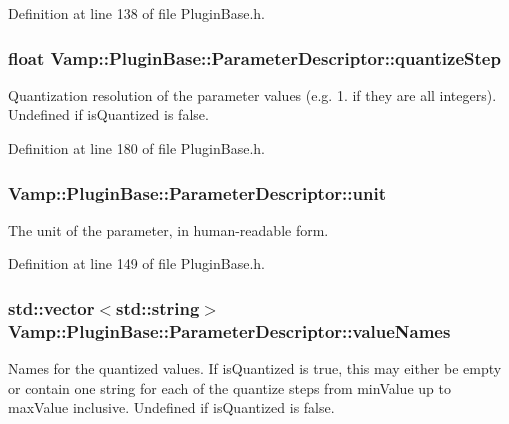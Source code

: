 Definition at line 138 of file Plugin\+Base.\+h.

\subsubsection[{\texorpdfstring{quantize\+Step}{quantizeStep}}]{\setlength{\rightskip}{0pt plus 5cm}float Vamp\+::\+Plugin\+Base\+::\+Parameter\+Descriptor\+::quantize\+Step}\hypertarget{struct_vamp_1_1_plugin_base_1_1_parameter_descriptor_a01f8387e7c853d5e4e35d4e9a37353d7}{}\label{struct_vamp_1_1_plugin_base_1_1_parameter_descriptor_a01f8387e7c853d5e4e35d4e9a37353d7}
Quantization resolution of the parameter values (e.\+g. 1. if they are all integers). Undefined if is\+Quantized is false. 

Definition at line 180 of file Plugin\+Base.\+h.

\subsubsection[{\texorpdfstring{unit}{unit}}]{ Vamp\+::\+Plugin\+Base\+::\+Parameter\+Descriptor\+::unit}\hypertarget{struct_vamp_1_1_plugin_base_1_1_parameter_descriptor_a3bc3df322e4c02e17e96bc6d44982d7b}{}\label{struct_vamp_1_1_plugin_base_1_1_parameter_descriptor_a3bc3df322e4c02e17e96bc6d44982d7b}
The unit of the parameter, in human-\/readable form. 

Definition at line 149 of file Plugin\+Base.\+h.

\subsubsection[{\texorpdfstring{value\+Names}{valueNames}}]{\setlength{\rightskip}{0pt plus 5cm}std\+::vector$<${\bf std\+::string}$>$ Vamp\+::\+Plugin\+Base\+::\+Parameter\+Descriptor\+::value\+Names}\hypertarget{struct_vamp_1_1_plugin_base_1_1_parameter_descriptor_a94df96f53835980b4739965007ff222b}{}\label{struct_vamp_1_1_plugin_base_1_1_parameter_descriptor_a94df96f53835980b4739965007ff222b}
Names for the quantized values. If is\+Quantized is true, this may either be empty or contain one string for each of the quantize steps from min\+Value up to max\+Value inclusive. Undefined if is\+Quantized is false.

